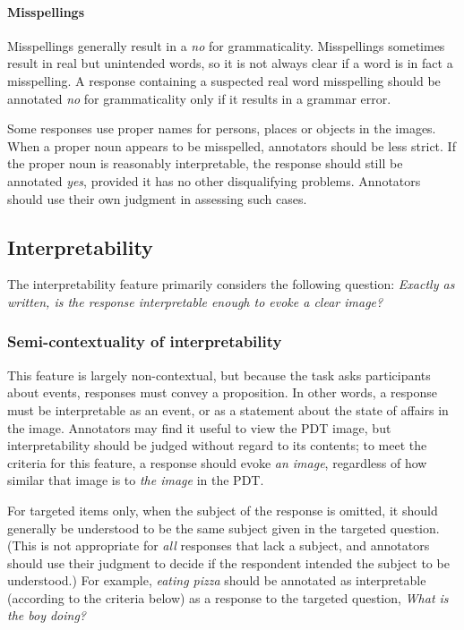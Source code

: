 \documentclass[12pt]{article}
\begin{document}
\paragraph{Misspellings} Misspellings generally result in a \textit{no} for grammaticality. Misspellings sometimes result in real but unintended words, so it is not always clear if a word is in fact a misspelling. A response containing a suspected real word misspelling should be annotated \textit{no} for grammaticality only if it results in a grammar error.

Some responses use proper names for persons, places or objects in the images. When a proper noun appears to be misspelled, annotators should be less strict. If the proper noun is reasonably interpretable, the response should still be annotated \textit{yes}, provided it has no other disqualifying problems. Annotators should use their own judgment in assessing such cases.


\subsection{Interpretability} \label{subsec:interpretability}
The interpretability feature primarily considers the following question: \textit{Exactly as written, is the response interpretable enough to evoke a clear image?} 

\subsubsection{Semi-contextuality of interpretability} \label{subsubsec:semicontext-interp} This feature is largely non-contextual, but because the task asks participants about events, responses must convey a proposition. In other words, a response must be interpretable as an event, or as a statement about the state of affairs in the image. Annotators may find it useful to view the PDT image, but interpretability should be judged without regard to its contents; to meet the criteria for this feature, a response should evoke \textit{an image}, regardless of how similar that image is to \textit{the image} in the PDT.

For targeted items only, when the subject of the response is omitted, it should generally be understood to be the same subject given in the targeted question. (This is not appropriate for \textit{all} responses that lack a subject, and annotators should use their judgment to decide if the respondent intended the subject to be understood.) For example, \textit{eating pizza} should be annotated as interpretable (according to the criteria below) as a response to the targeted question, \textit{What is the boy doing?}
\end{document}
